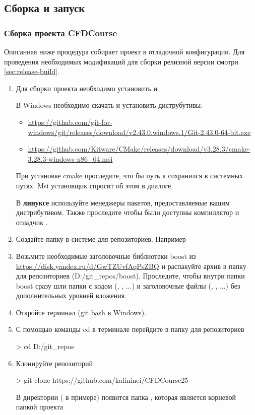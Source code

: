 \subsection{Сборка и запуск}
\subsubsection{Сборка проекта CFDCourse}

Описанная ниже процедура собирает проект в отладочной конфигурации.
Для проведения необходимых модификаций для сборки релизной версии смотри \ref{sec:release-build}.

\label{sec:install-prep}
\begin{enumerate}
\item
Для сборки проекта необходимо установить  и 

В Windows необходимо скачать и установить диструбутивы:
\begin{itemize}
\item
\url{https://github.com/git-for-windows/git/releases/download/v2.43.0.windows.1/Git-2.43.0-64-bit.exe}
\item
\url{https://github.com/Kitware/CMake/releases/download/v3.28.3/cmake-3.28.3-windows-x86\_64.msi}
\end{itemize}

При установке cmake проследите, что бы путь к  сохранился в системных путях.
Msi установщик спросит об этом в диалоге.

В {\bf линуксе} используйте менеджеры пакетов, предоставляемые вашим дистрибутивом.
Также проследите чтобы были доступны компиллятор  и отладчик .

\item
Создайте папку в системе для репозиториев. Например 

\item
Возьмите необходимые заголовочные библиотеки boost из \url{https://disk.yandex.ru/d/GwTZUvfAqPsZBQ}
и распакуйте архив в папку для репозиториев (D:/git\_repos/boost).
Проследите, чтобы внутри папки boost сразу шли папки с кодом (, , ...)
и заголовочные файлы (, , ...)
без дополнительных уровней вложения.

\item
Откройте терминал (git bash в Windows).

\item
С помощью команды cd в терминале перейдите в папку для репозиториев
\begin{shelloutput}
> cd D:/git_repos
\end{shelloutput}

\item
Клонируйте репозиторий
\begin{shelloutput}
> git clone https://github.com/kalininei/CFDCourse25
\end{shelloutput}
В директории ( в примере) появится папка , которая является корневой папкой проекта
\end{enumerate}

